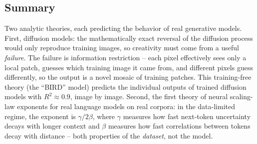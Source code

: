 \documentclass[11pt]{article}
\begin{document}
\subsection*{Summary}
Two analytic theories, each predicting the behavior of real generative models. First, diffusion models: the mathematically exact reversal of the diffusion process would only reproduce training images, so creativity must come from a useful \emph{failure}. The failure is information restriction -- each pixel effectively sees only a local patch, guesses which training image it came from, and different pixels guess differently, so the output is a novel mosaic of training patches. This training-free theory (the ``BIRD'' model) predicts the individual outputs of trained diffusion models with $R^2 \approx 0.9$, image by image. Second, the first theory of neural scaling-law exponents for real language models on real corpora: in the data-limited regime, the exponent is $\gamma / 2\beta$, where $\gamma$ measures how fast next-token uncertainty decays with longer context and $\beta$ measures how fast correlations between tokens decay with distance -- both properties of the \emph{dataset}, not the model.
\end{document}
